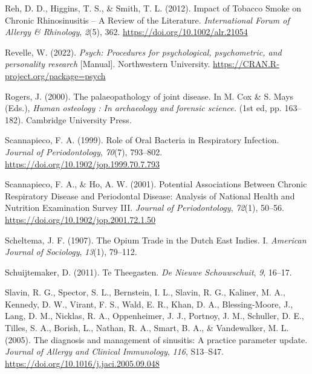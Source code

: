 \documentclass[
]{article}
\newlength{\cslhangindent}
\newenvironment{CSLReferences}[2] %
 {\begin{list}{}{%
  \setlength{\itemindent}{0pt}
  \setlength{\leftmargin}{0pt}
  \setlength{\parsep}{0pt}
  \ifodd #1
   \setlength{\leftmargin}{\cslhangindent}
   \setlength{\itemindent}{-1\cslhangindent}
  \fi
  \setlength{\itemsep}{#2\baselineskip}}}
 {\end{list}}
\begin{document}
\begin{CSLReferences}{1}{0}
Reh, D. D., Higgins, T. S., \& Smith, T. L. (2012). Impact of {Tobacco
Smoke} on {Chronic Rhinosinusitis} -- {A Review} of the {Literature}.
\emph{International Forum of Allergy \& Rhinology}, \emph{2}(5), 362.
\url{https://doi.org/10.1002/alr.21054}

Revelle, W. (2022). \emph{Psych: {Procedures} for psychological,
psychometric, and personality research} {[}Manual{]}. {Northwestern
University}. \url{https://CRAN.R-project.org/package=psych}

Rogers, J. (2000). The palaeopathology of joint disease. In M. Cox \& S.
Mays (Eds.), \emph{Human osteology : {In} archaeology and forensic
science.} (1st ed, pp. 163--182). {Cambridge University Press}.

Scannapieco, F. A. (1999). Role of {Oral Bacteria} in {Respiratory
Infection}. \emph{Journal of Periodontology}, \emph{70}(7), 793--802.
\url{https://doi.org/10.1902/jop.1999.70.7.793}

Scannapieco, F. A., \& Ho, A. W. (2001). Potential {Associations Between
Chronic Respiratory Disease} and {Periodontal Disease}: {Analysis} of
{National Health} and {Nutrition Examination Survey III}. \emph{Journal
of Periodontology}, \emph{72}(1), 50--56.
\url{https://doi.org/10.1902/jop.2001.72.1.50}

Scheltema, J. F. (1907). The {Opium Trade} in the {Dutch East Indies}.
{I}. \emph{American Journal of Sociology}, \emph{13}(1), 79--112.

Schuijtemaker, D. (2011). Te Theegasten. \emph{De Nieuwe Schouwschuit},
\emph{9}, 16--17.

Slavin, R. G., Spector, S. L., Bernstein, I. L., Slavin, R. G., Kaliner,
M. A., Kennedy, D. W., Virant, F. S., Wald, E. R., Khan, D. A.,
Blessing-Moore, J., Lang, D. M., Nicklas, R. A., Oppenheimer, J. J.,
Portnoy, J. M., Schuller, D. E., Tilles, S. A., Borish, L., Nathan, R.
A., Smart, B. A., \& Vandewalker, M. L. (2005). The diagnosis and
management of sinusitis: {A} practice parameter update. \emph{Journal of
Allergy and Clinical Immunology}, \emph{116}, S13--S47.
\url{https://doi.org/10.1016/j.jaci.2005.09.048}


\end{CSLReferences}
\end{document}
